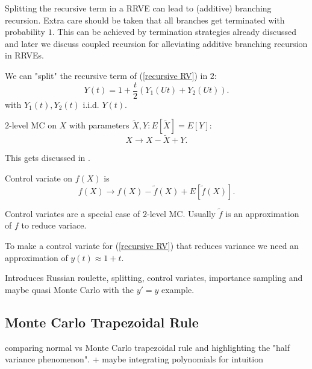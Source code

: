 \documentclass[a4paper,12pt]{article}
\begin{document}
Splitting the recursive term in a RRVE can lead to (additive) branching recursion.
Extra care should be taken that all branches get terminated with probability $1$. This can be
achieved by termination strategies already discussed and later we discuss coupled recursion for
alleviating additive branching recursion in RRVEs.

\begin{example}
    We can "split" the recursive term of  (\ref{recursive RV}) in $2$:
    \[
        Y(t) = 1 + \frac{t}{2}(Y_{1}(Ut)+Y_{2}(Ut))
        .\]
    with $Y_{1}(t),Y_{2}(t)$ i.i.d. $Y(t)$.
\end{example}

\vspace{0.2cm}

\begin{python}
\end{python}

\begin{definition}[$2$-level MC] \label{2 level}
    $2$-level MC on $X$ with parameters $\tilde{X}, Y: E[\tilde{X}]=E[Y]$:
    \[
        X \rightarrow X-\tilde{X} + Y
        .\]
\end{definition}

This gets discussed in \cite{giles_multilevel_2013}.

\begin{definition} \label{CV}
    Control variate on $f(X)$ is
    \[
        f(X) \rightarrow f(X)-\tilde{f}(X) + E[\tilde{f}(X)]
        .\]
\end{definition}
Control variates are a special case of $2$-level MC. Usually $\tilde{f}$ is an approximation
of $f$ to reduce variace.

\begin{example}
    To make a control variate for (\ref{recursive RV}) that reduces variance
    we need an approximation of $y(t) \approx 1+t$.
\end{example}

Introduces Russian roulette, splitting, control variates, importance sampling and maybe quasi Monte Carlo with the
$y'=y$ example.

\subsection{Monte Carlo Trapezoidal Rule}
comparing normal vs Monte Carlo trapezoidal rule and highlighting the "half variance phenomenon".
+ maybe integrating polynomials for intuition
\end{document}
